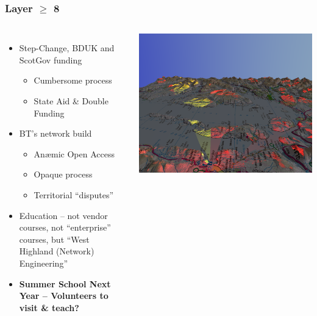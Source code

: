 \documentclass{beamer}
\begin{document}
\begin{frame}
  \frametitle{Layer $\geq$ 8}
  \begin{columns}
    \begin{itemize}
      \item Step-Change, BDUK and ScotGov funding
        \begin{itemize}
          \item Cumbersome process
          \item State Aid \& Double Funding
        \end{itemize}
      \item BT's network build
        \begin{itemize}
          \item An\ae{}mic Open Access
          \item Opaque process
          \item Territorial ``disputes''
        \end{itemize}
      \item Education -- not vendor courses, not ``enterprise''
        courses, but ``West Highland (Network) Engineering''
      \item \textbf{\color{hubsblue} Summer School Next Year --
        Volunteers to visit \& teach?}
    \end{itemize}
    \hspace{-2em}\includegraphics[width=1.1\textwidth]{portree-3d.png}\\

\end{columns}
\end{frame}
\end{document}
